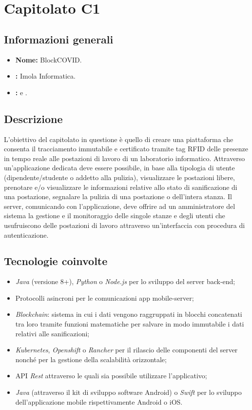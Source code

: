 \section{Capitolato C1}

\subsection{Informazioni generali}{
\begin{itemize}
\item \textbf{Nome:} BlockCOVID.
\item \textbf{\commitProg:} Imola Informatica.
\item \textbf{\proponProg:} \VT{} e \CR.
\end{itemize}
}

\subsection{Descrizione}{
L'obiettivo del capitolato in questione è quello di creare una piattaforma che consenta il tracciamento immutabile e certificato tramite tag RFID delle presenze in tempo reale alle postazioni di lavoro di un laboratorio informatico. Attraverso un'applicazione dedicata deve essere possibile, in base alla tipologia di utente (dipendente/studente o addetto alla pulizia), visualizzare le postazioni libere, prenotare e/o visualizzare le informazioni relative allo stato di sanificazione di una postazione, segnalare la pulizia di una postazione o dell'intera stanza. Il server, comunicando con l'applicazione, deve offrire ad un amministratore del sistema la gestione e il monitoraggio delle singole stanze e degli utenti che usufruiscono delle postazioni di lavoro attraverso un'interfaccia con procedura di autenticazione.

}

\subsection{Tecnologie coinvolte}{
\begin{itemize}
\item \textit{Java} (versione 8+), \textit{Python} o \textit{Node.js} per lo sviluppo del server back-end;
\item Protocolli asincroni per le comunicazioni app mobile-server;
\item \textit{Blockchain}: sistema in cui i dati vengono raggruppati in blocchi concatenati tra loro tramite funzioni matematiche per salvare in modo immutabile i dati relativi alle sanificazioni;
\item \textit{Kubernetes}, \textit{Openshift} o \textit{Rancher} per il rilascio delle componenti
del server nonché per la gestione della scalabilità orizzontale;
\item API \textit{Rest} attraverso le quali sia possibile utilizzare l'applicativo;

\item \textit{Java} (attraverso il kit di sviluppo software Android) o \textit{Swift} per lo sviluppo dell'applicazione mobile rispettivamente Android o iOS.
\end{itemize}
}

